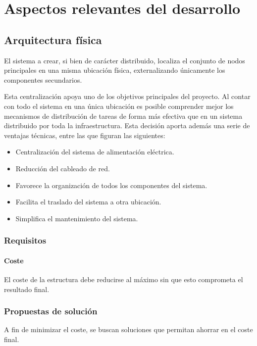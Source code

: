 \chapter{Aspectos relevantes del desarrollo}

\section{Arquitectura física}

El sistema a crear, si bien de carácter distribuido, localiza el conjunto de nodos principales en una misma ubicación física, externalizando únicamente los componentes secundarios.

Esta centralización apoya uno de los objetivos principales del proyecto. Al contar con todo el sistema en una única ubicación es posible comprender mejor los mecanismos de distribución de tareas de forma más efectiva que en un sistema distribuido por toda la infraestructura. Esta decisión aporta además una serie de ventajas técnicas, entre las que figuran las siguientes:

\begin{itemize}
\item Centralización del sistema de alimentación eléctrica.
\item Reducción del cableado de red.
\item Favorece la organización de todos los componentes del sistema.
\item Facilita el traslado del sistema a otra ubicación.
\item Simplifica el mantenimiento del sistema.
\end{itemize}

\subsection{Requisitos}

\subsubsection{Coste}

El coste de la estructura debe reducirse al máximo sin que esto comprometa el resultado final.

\subsection{Propuestas de solución}

A fin de minimizar el coste, se buscan soluciones que permitan ahorrar en el coste final.

